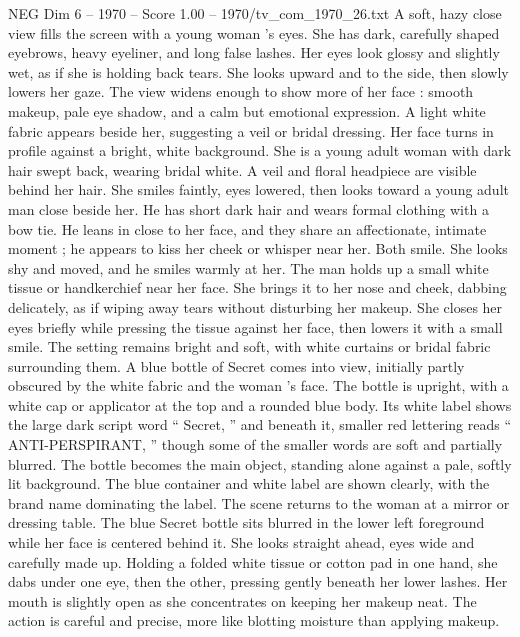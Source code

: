\begin{textsample}{NEG Dim 6 – 1970 – Score 1.00 – 1970/tv\_com\_1970\_26.txt}  \label{ex:f6_neg_056}
A soft, hazy close view fills the screen with a young woman ’s eyes.
She has dark, carefully shaped eyebrows, heavy eyeliner, and long false lashes.
Her eyes look glossy and slightly wet, as if she is holding back tears.
She looks upward and to the side, then slowly lowers her gaze.
The view widens enough to show more of her face : smooth makeup, pale eye shadow, and a calm but emotional expression.
A light white fabric appears beside her, suggesting a veil or bridal dressing.
Her face turns in profile against a bright, white background.
She is a young adult woman with dark hair swept back, wearing bridal white.
A veil and floral headpiece are visible behind her hair.
She smiles faintly, eyes lowered, then looks toward a young adult man close beside her.
He has short dark hair and wears formal clothing with a bow tie.
He leans in close to her face, and they share an affectionate, intimate moment ; he appears to kiss her cheek or whisper near her.
Both smile.
She looks shy and moved, and he smiles warmly at her.
The man holds up a small white tissue or handkerchief near her face.
She brings it to her nose and cheek, dabbing delicately, as if wiping away tears without disturbing her makeup.
She closes her eyes briefly while pressing the tissue against her face, then lowers it with a small smile.
The setting remains bright and soft, with white curtains or bridal fabric surrounding them.
A blue bottle of Secret comes into view, initially partly obscured by the white fabric and the woman ’s face.
The bottle is upright, with a white cap or applicator at the top and a rounded blue body.
Its white label shows the large dark script word “ Secret, ” and beneath it, smaller red lettering reads “ ANTI-PERSPIRANT, ” though some of the smaller words are soft and partially blurred.
The bottle becomes the main object, standing alone against a pale, softly lit background.
The blue container and white label are shown clearly, with the brand name dominating the label.
The scene returns to the woman at a mirror or dressing table.
The blue Secret bottle sits blurred in the lower left foreground while her face is centered behind it.
She looks straight ahead, eyes wide and carefully made up.
Holding a folded white tissue or cotton pad in one hand, she dabs under one eye, then the other, pressing gently beneath her lower lashes.
Her mouth is slightly open as she concentrates on keeping her makeup neat.
The action is careful and precise, more like blotting moisture than applying makeup.

\end{textsample}
